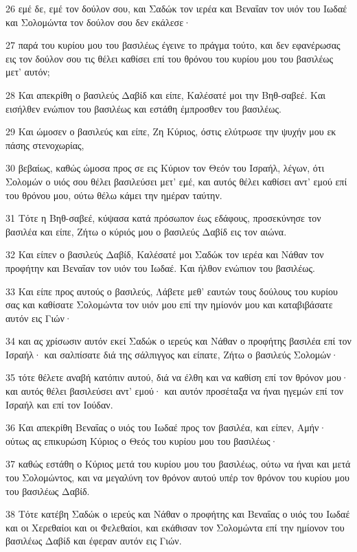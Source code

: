 \par 26 εμέ δε, εμέ τον δούλον σου, και Σαδώκ τον ιερέα και Βεναΐαν τον υιόν του Ιωδαέ και Σολομώντα τον δούλον σου δεν εκάλεσε·
\par 27 παρά του κυρίου μου του βασιλέως έγεινε το πράγμα τούτο, και δεν εφανέρωσας εις τον δούλον σου τις θέλει καθίσει επί του θρόνου του κυρίου μου του βασιλέως μετ' αυτόν;
\par 28 Και απεκρίθη ο βασιλεύς Δαβίδ και είπε, Καλέσατέ μοι την Βηθ-σαβεέ. Και εισήλθεν ενώπιον του βασιλέως και εστάθη έμπροσθεν του βασιλέως.
\par 29 Και ώμοσεν ο βασιλεύς και είπε, Ζη Κύριος, όστις ελύτρωσε την ψυχήν μου εκ πάσης στενοχωρίας,
\par 30 βεβαίως, καθώς ώμοσα προς σε εις Κύριον τον Θεόν του Ισραήλ, λέγων, ότι Σολομών ο υιός σου θέλει βασιλεύσει μετ' εμέ, και αυτός θέλει καθίσει αντ' εμού επί του θρόνου μου, ούτω θέλω κάμει την ημέραν ταύτην.
\par 31 Τότε η Βηθ-σαβεέ, κύψασα κατά πρόσωπον έως εδάφους, προσεκύνησε τον βασιλέα και είπε, Ζήτω ο κύριός μου ο βασιλεύς Δαβίδ εις τον αιώνα.
\par 32 Και είπεν ο βασιλεύς Δαβίδ, Καλέσατέ μοι Σαδώκ τον ιερέα και Νάθαν τον προφήτην και Βεναΐαν τον υιόν του Ιωδαέ. Και ήλθον ενώπιον του βασιλέως.
\par 33 Και είπε προς αυτούς ο βασιλεύς, Λάβετε μεθ' εαυτών τους δούλους του κυρίου σας και καθίσατε Σολομώντα τον υιόν μου επί την ημίονόν μου και καταβιβάσατε αυτόν εις Γιών·
\par 34 και ας χρίσωσιν αυτόν εκεί Σαδώκ ο ιερεύς και Νάθαν ο προφήτης βασιλέα επί τον Ισραήλ· και σαλπίσατε διά της σάλπιγγος και είπατε, Ζήτω ο βασιλεύς Σολομών·
\par 35 τότε θέλετε αναβή κατόπιν αυτού, διά να έλθη και να καθίση επί τον θρόνον μου· και αυτός θέλει βασιλεύσει αντ' εμού· και αυτόν προσέταξα να ήναι ηγεμών επί τον Ισραήλ και επί τον Ιούδαν.
\par 36 Και απεκρίθη Βεναΐας ο υιός του Ιωδαέ προς τον βασιλέα, και είπεν, Αμήν· ούτως ας επικυρώση Κύριος ο Θεός του κυρίου μου του βασιλέως·
\par 37 καθώς εστάθη ο Κύριος μετά του κυρίου μου του βασιλέως, ούτω να ήναι και μετά του Σολομώντος, και να μεγαλύνη τον θρόνον αυτού υπέρ τον θρόνον του κυρίου μου του βασιλέως Δαβίδ.
\par 38 Τότε κατέβη Σαδώκ ο ιερεύς και Νάθαν ο προφήτης και Βεναΐας ο υιός του Ιωδαέ και οι Χερεθαίοι και οι Φελεθαίοι, και εκάθισαν τον Σολομώντα επί την ημίονον του βασιλέως Δαβίδ και έφεραν αυτόν εις Γιών.
